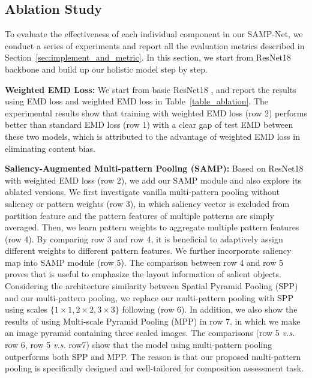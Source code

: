 \documentclass{bmvc2k}
\begin{document}
\subsection{Ablation Study}
\label{sec:ablation}

To evaluate the effectiveness of each individual component in our SAMP-Net, we conduct a series of experiments and report all the evaluation metrics described in Section~\ref{sec:implement_and_metric}. In this section, we start from ResNet18 backbone and build up our holistic model step by step.

\noindent\textbf{Weighted EMD Loss:} We start from basic ResNet18 \cite{he2016deep}, and report the results using EMD loss and weighted EMD loss in Table~\ref{table_ablation}. The experimental results show that training with weighted EMD loss (row 2) performs better than standard EMD loss (row 1) with a clear gap of test EMD between these two models, which is attributed to the advantage of weighted EMD loss in eliminating content bias. 

\noindent\textbf{Saliency-Augmented Multi-pattern Pooling (SAMP):} Based on ResNet18 with weighted EMD loss (row 2), we add our SAMP module and also explore its ablated versions. 
We first investigate vanilla multi-pattern pooling without saliency or pattern weights (row 3), in which saliency vector is excluded from partition feature and the pattern features of multiple patterns are simply averaged. 
Then, we learn pattern weights to aggregate multiple pattern features (row 4). By comparing row 3 and row 4,  it is beneficial to adaptively assign different weights to different pattern features. 
We further incorporate saliency map into SAMP module (row 5). The comparison between row 4 and row 5 proves that is useful to emphasize the layout information of salient objects.
Considering the architecture similarity between Spatial Pyramid Pooling (SPP) \cite{He2015SpatialPP} and our multi-pattern pooling, we replace our multi-pattern pooling with SPP using scales $\{1 \times 1, 2 \times 2, 3 \times 3\}$ following \cite{Chen2020AdaptiveFD} (row 6).
\textcolor[rgb]{0,0,0}{In addition, we also show the results of using Multi-scale Pyramid Pooling (MPP) \cite{yoo2015multi} in row 7, in which we make an image pyramid containing three scaled images. The comparisons (row 5 \emph{v.s.} row 6, row 5 \emph{v.s.} row7) show that the model using multi-pattern pooling outperforms both SPP and MPP.}
The reason is that our proposed multi-pattern pooling is specifically designed and well-tailored for composition assessment task.
\end{document}
